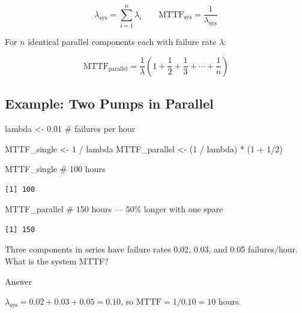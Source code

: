 \documentclass[
  letterpaper,
  DIV=11,
  numbers=noendperiod]{scrreprt}
\newenvironment{Shaded}{\begin{snugshade}}{\end{snugshade}}
\newcommand{\CommentTok}[1]{\textcolor[rgb]{0.37,0.37,0.37}{#1}}
\newcommand{\DecValTok}[1]{\textcolor[rgb]{0.68,0.00,0.00}{#1}}
\newcommand{\FloatTok}[1]{\textcolor[rgb]{0.68,0.00,0.00}{#1}}
\newcommand{\NormalTok}[1]{\textcolor[rgb]{0.00,0.23,0.31}{#1}}
\newcommand{\OtherTok}[1]{\textcolor[rgb]{0.00,0.23,0.31}{#1}}
\newcommand{\SpecialCharTok}[1]{\textcolor[rgb]{0.37,0.37,0.37}{#1}}
\begin{document}
\[\lambda_{\text{sys}} = \sum_{i=1}^{n} \lambda_i \qquad \text{MTTF}_{\text{sys}} = \frac{1}{\lambda_{\text{sys}}}\]

For \(n\) identical parallel components each with failure rate
\(\lambda\):

\[\text{MTTF}_{\text{parallel}} = \frac{1}{\lambda}\left(1 + \frac{1}{2} + \frac{1}{3} + \cdots + \frac{1}{n}\right)\]

\subsection{Example: Two Pumps in
Parallel}\label{example-two-pumps-in-parallel}

\begin{Shaded}
\begin{Highlighting}[]
\NormalTok{lambda }\OtherTok{\textless{}{-}} \FloatTok{0.01}  \CommentTok{\# failures per hour}

\NormalTok{MTTF\_single   }\OtherTok{\textless{}{-}} \DecValTok{1} \SpecialCharTok{/}\NormalTok{ lambda}
\NormalTok{MTTF\_parallel }\OtherTok{\textless{}{-}}\NormalTok{ (}\DecValTok{1} \SpecialCharTok{/}\NormalTok{ lambda) }\SpecialCharTok{*}\NormalTok{ (}\DecValTok{1} \SpecialCharTok{+} \DecValTok{1}\SpecialCharTok{/}\DecValTok{2}\NormalTok{)}

\NormalTok{MTTF\_single    }\CommentTok{\# 100 hours}
\end{Highlighting}
\end{Shaded}

\begin{verbatim}
[1] 100
\end{verbatim}

\begin{Shaded}
\begin{Highlighting}[]
\NormalTok{MTTF\_parallel  }\CommentTok{\# 150 hours — 50\% longer with one spare}
\end{Highlighting}
\end{Shaded}

\begin{verbatim}
[1] 150
\end{verbatim}

\begin{tcolorbox}[enhanced jigsaw, arc=.35mm, bottomrule=.15mm, bottomtitle=1mm, breakable, colback=white, colbacktitle=quarto-callout-tip-color!10!white, colframe=quarto-callout-tip-color-frame, coltitle=black, left=2mm, leftrule=.75mm, opacityback=0, opacitybacktitle=0.6, rightrule=.15mm, title=\textcolor{quarto-callout-tip-color}{\faLightbulb}\hspace{0.5em}{Review}, titlerule=0mm, toprule=.15mm, toptitle=1mm]

Three components in series have failure rates 0.02, 0.03, and 0.05
failures/hour. What is the system MTTF?

Answer

\(\lambda_{\text{sys}} = 0.02 + 0.03 + 0.05 = 0.10\), so
\(\text{MTTF} = 1/0.10 = 10\) hours.

\end{tcolorbox}
\end{document}
